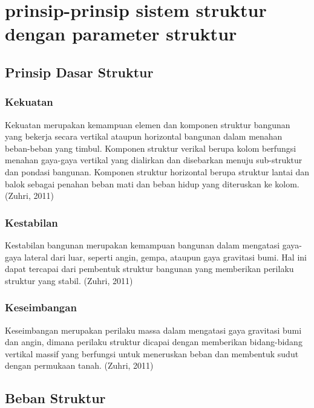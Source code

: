 \documentclass[../modul_skb.tex]{subfiles}
\begin{document}
\section{prinsip-prinsip sistem struktur dengan parameter struktur }%
\label{sec:prinsip-prinsip sistem struktur dengan parameter struktur }

\subsection{Prinsip Dasar Struktur}%
\label{sub:Prinsip Dasar Struktur}

\subsubsection{Kekuatan}%
\label{ssub:Kekuatan}

Kekuatan merupakan kemampuan elemen dan komponen struktur bangunan yang bekerja secara vertikal ataupun horizontal bangunan dalam menahan beban-beban yang timbul. Komponen struktur verikal berupa kolom berfungsi menahan gaya-gaya vertikal yang dialirkan dan disebarkan menuju sub-struktur dan pondasi bangunan. Komponen struktur horizontal berupa struktur lantai dan balok sebagai penahan beban mati dan beban hidup yang diteruskan ke kolom. (Zuhri, 2011)

\subsubsection{Kestabilan}%
\label{ssub:Kestabilan}

Kestabilan bangunan merupakan kemampuan bangunan dalam mengatasi gaya-gaya lateral dari luar, seperti angin, gempa, ataupun gaya gravitasi bumi. Hal ini dapat tercapai dari pembentuk struktur bangunan yang memberikan perilaku struktur yang stabil. (Zuhri, 2011)

\subsubsection{Keseimbangan}%
\label{ssub:Keseimbangan}

Keseimbangan merupakan perilaku massa dalam mengatasi gaya gravitasi bumi dan angin, dimana perilaku struktur dicapai dengan memberikan bidang-bidang vertikal massif yang berfungsi untuk meneruskan beban dan membentuk sudut dengan permukaan tanah. (Zuhri, 2011)

\subsection{Beban Struktur}%
\label{sub:Beban Struktur}
\end{document}
